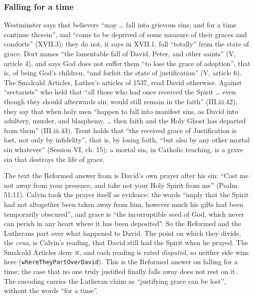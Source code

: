 \documentclass[11pt]{article}
\begin{document}
\subsubsection*{Falling for a time}
Westminster says that believers “may … fall into grievous sins; and for a time continue therein”, and “come to be deprived of some measure of their graces and comforts” (XVII.3); they do not, it says in XVII.1, fall “totally” from the state of grace. Dort names “the lamentable fall of David, Peter, and other saints” (V, article 4), and says God does not suffer them “to lose the grace of adoption”, that is, of being God’s children, “and forfeit the state of justification” (V, article 6). The Smalcald Articles, Luther’s articles of 1537, read David otherwise. Against “sectarists” who held that “all those who had once received the Spirit … even though they should afterwards sin, would still remain in the faith” (III.iii.42), they say that when holy men “happen to fall into manifest sins, as David into adultery, murder, and blasphemy, … then faith and the Holy Ghost has departed from them” (III.iii.43). Trent holds that “the received grace of Justification is lost, not only by infidelity”, that is, by losing faith, “but also by any other mortal sin whatever” (Session VI, ch. 15); a mortal sin, in Catholic teaching, is a grave sin that destroys the life of grace.

The text the Reformed answer from is David’s own prayer after his sin: “Cast me not away from your presence, and take not your Holy Spirit from me” (Psalm 51:11). Calvin took the prayer itself as evidence: the words “imply that the Spirit had not altogether been taken away from him, however much his gifts had been temporarily obscured”, and grace is “the incorruptible seed of God, which never can perish in any heart where it has been deposited”. So the Reformed and the Lutherans part over what happened to David. The point on which they divide, the \emph{crux}, is Calvin’s reading, that David still had the Spirit when he prayed. The Smalcald Articles deny it, and each reading is rated \emph{disputed}, so neither side wins here (\texttt{where\allowbreak{}They\allowbreak{}Part\allowbreak{}Over\allowbreak{}David}). This is the Reformed answer on falling for a time; the case that no one truly justified finally falls away does not rest on it. The encoding carries the Lutheran claim as “justifying grace can be lost”, without the words “for a time”.
\end{document}
